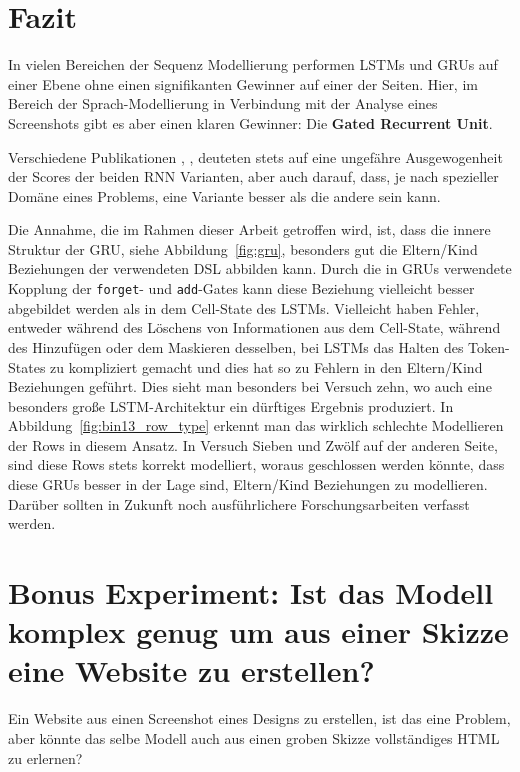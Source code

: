 \documentclass[pdftex,a4paper,halfparskip, article]{scrartcl}
\begin{document}
\section{Fazit}

In vielen Bereichen der Sequenz Modellierung performen LSTMs und GRUs auf einer Ebene ohne einen signifikanten Gewinner auf einer der Seiten. Hier, im Bereich der Sprach-Modellierung in Verbindung mit der Analyse eines Screenshots gibt es aber einen klaren Gewinner: Die \textbf{Gated Recurrent Unit}.

Verschiedene Publikationen \cite{paperGRUComparison}, \cite{lstmSearchSpace}, \cite{colahsBlogLSTM} deuteten stets auf eine ungefähre Ausgewogenheit der Scores der beiden RNN Varianten, aber auch darauf, dass, je nach spezieller Domäne eines Problems, eine Variante besser als die andere sein kann.

Die Annahme, die im Rahmen dieser Arbeit getroffen wird, ist, dass die innere Struktur der GRU, siehe Abbildung~\ref{fig:gru}, besonders gut die Eltern/Kind Beziehungen der verwendeten DSL abbilden kann. Durch die in GRUs verwendete Kopplung der \texttt{forget}- und \texttt{add}-Gates kann diese Beziehung vielleicht besser abgebildet werden als in dem Cell-State des LSTMs. Vielleicht haben Fehler, entweder während des Löschens von Informationen aus dem Cell-State, während des Hinzufügen oder dem Maskieren desselben, bei LSTMs das Halten des Token-States zu kompliziert gemacht und dies hat so zu Fehlern in den Eltern/Kind Beziehungen geführt. Dies sieht man besonders bei Versuch zehn, wo auch eine besonders große LSTM-Architektur ein dürftiges Ergebnis produziert. In Abbildung~\ref{fig:bin13_row_type} erkennt man das wirklich schlechte Modellieren der Rows in diesem Ansatz. In Versuch Sieben und Zwölf auf der anderen Seite, sind diese Rows stets korrekt modelliert, woraus geschlossen werden könnte, dass diese GRUs besser in der Lage sind, Eltern/Kind Beziehungen zu modellieren. Darüber sollten in Zukunft noch ausführlichere Forschungsarbeiten verfasst werden.

\section{Bonus Experiment: Ist das Modell komplex genug um aus einer Skizze eine Website zu erstellen?}

Ein Website aus einen Screenshot eines Designs zu erstellen, ist das eine Problem, aber könnte das selbe Modell auch aus einen groben Skizze vollständiges HTML zu erlernen?
\end{document}
